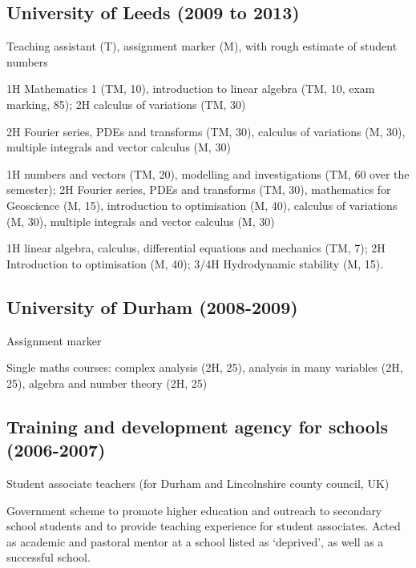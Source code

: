 \documentclass[letterpaper]{article}
\renewenvironment{itemize}{
  \begin{list}{}{
    \setlength{\leftmargin}{1.5em}
  }
}{
  \end{list}
}
\begin{document}
\subsection*{University of Leeds (2009 to 2013)}
\begin{itemize}
\item Teaching assistant (T), assignment marker (M), with rough estimate of
student numbers
\begin{itemize}
	\item[12/13:] 1H Mathematics 1 (TM, 10), introduction to linear algebra (TM,
	10, exam marking, 85); 2H calculus of variations (TM, 30)
	\item[11/12:] 2H Fourier series, PDEs and transforms (TM, 30), calculus of
	variations (M, 30), multiple integrals and vector calculus (M, 30)
	\item[10/11:] 1H numbers and vectors (TM, 20), modelling and investigations
	(TM, 60 over the semester); 2H Fourier series, PDEs and transforms (TM, 30),
	mathematics for Geoscience (M, 15), introduction to optimisation (M, 40),
	calculus of variations (M, 30), multiple integrals and vector calculus (M,
	30)
	\item[09/10:] 1H linear algebra, calculus, differential equations and
	mechanics (TM, 7); 2H Introduction to optimisation (M, 40); 3/4H
	Hydrodynamic stability (M, 15).
\end{itemize}
\end{itemize}


\subsection*{University of Durham (2008-2009)}
\begin{itemize}
\item Assignment marker
\begin{itemize}
	\item[--] Single maths courses: complex analysis (2H, 25), analysis in many
	variables (2H, 25), algebra and number theory (2H, 25)
\end{itemize}
\end{itemize}


\subsection*{Training and development agency for schools (2006-2007)}
\begin{itemize}
	\item Student associate teachers (for Durham and Lincolnshire county
	council, UK)
\begin{itemize}
	\item[--] Government scheme to promote higher education and outreach to
	secondary school students and to provide teaching experience for student
	associates. Acted as academic and pastoral mentor at a school listed as
	`deprived', as well as a successful school.
\end{itemize}
\end{itemize}
\end{document}
